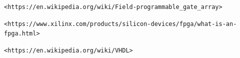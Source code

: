 \documentclass[12pt,a4paper]{article}
\begin{document}
\raggedright

\newpage                                                                                %
\begin{thebibliography}{}

\texttt{<https://en.wikipedia.org/wiki/Field-programmable\_gate\_array>}

\texttt{<https://www.xilinx.com/products/silicon-devices/fpga/what-is-an-fpga\newline .html>}


\texttt{<https://en.wikipedia.org/wiki/VHDL>}



\end{thebibliography}



\clearpage
\end{document}
